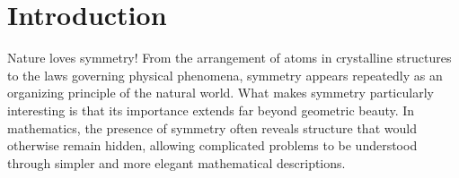\documentclass[14pt,letterpaper]{article}
\theoremstyle{plain}
\theoremstyle{definition}
\theoremstyle{remark}
\begin{document}

\section{Introduction}
\label{sec:introduction}

Nature loves symmetry!
From the arrangement of atoms in crystalline structures
to the laws governing physical phenomena, symmetry appears
repeatedly as an organizing principle of the natural world.
What makes symmetry particularly interesting is that its
importance extends far beyond geometric beauty. In
mathematics, the presence of symmetry often reveals
structure that would otherwise remain hidden, allowing
complicated problems to be understood through simpler
and more elegant mathematical descriptions.
\end{document}
